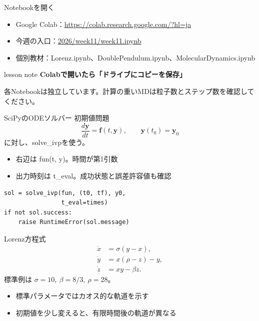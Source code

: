 \documentclass[12pt,aspectratio=43]{beamer}
\newcommand{\code}[1]{{\codefont #1}}
\newenvironment{lessonbox}
  {\begin{beamercolorbox}[wd=\linewidth,sep=1.5mm]{lesson note}}
  {\end{beamercolorbox}\par}
\begin{document}
\begin{frame}[t]{Notebookを開く}
  \begin{itemize}
    \setlength{\itemsep}{2mm}
    \item Google Colab：\small\url{https://colab.research.google.com/?hl=ja}
    \item 今週の入口：\small\href{https://github.com/nogaki/Computational_Physics_B/tree/main/2026/week11/week11.ipynb}{2026/week11/week11.ipynb}
    \item 個別教材：\code{Lorenz.ipynb}、\code{DoublePendulum.ipynb}、\code{MolecularDynamics.ipynb}
  \end{itemize}
  \vspace{2mm}
  \begin{lessonbox}
    \textbf{Colabで開いたら「ドライブにコピーを保存」}\par
    \small 各Notebookは独立しています。計算の重いMDは粒子数とステップ数を確認してください。
  \end{lessonbox}
\end{frame}

\begin{frame}[t,fragile]{SciPyのODEソルバー}
  初期値問題
  \[
    \frac{d\mathbf{y}}{dt}=\mathbf{f}(t,\mathbf{y}),
    \qquad \mathbf{y}(t_0)=\mathbf{y}_0
  \]
  に対し、\code{solve\_ivp}を使う。
  \begin{itemize}
    \setlength{\itemsep}{1mm}
    \item 右辺は \code{fun(t, y)}。時間が第1引数
    \item 出力時刻は \code{t\_eval}。成功状態と誤差許容値も確認
  \end{itemize}
  \begin{lstlisting}
sol = solve_ivp(fun, (t0, tf), y0,
                t_eval=times)
if not sol.success:
    raise RuntimeError(sol.message)
  \end{lstlisting}
\end{frame}

\begin{frame}[t]{Lorenz方程式}
  \[
    \begin{aligned}
      \dot{x}&=\sigma(y-x),\\
      \dot{y}&=x(\rho-z)-y,\\
      \dot{z}&=xy-\beta z.
    \end{aligned}
  \]
  標準例は $\sigma=10,\ \beta=8/3,\ \rho=28$。
  \begin{itemize}
    \item 標準パラメータではカオス的な軌道を示す
    \item 初期値を少し変えると、有限時間後の軌道が異なる
  \end{itemize}
\end{frame}
\end{document}
